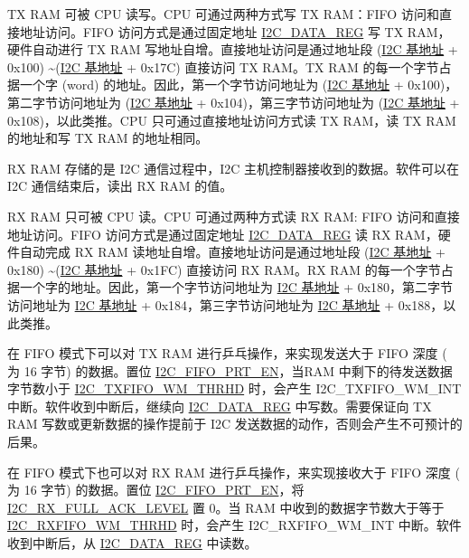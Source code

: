 \documentclass[main\_\_CN.tex]{subfiles}
\begin{document}
TX RAM 可被 CPU 读写。CPU 可通过两种方式写 TX RAM：FIFO 访问和直接地址访问。FIFO 访问方式是通过固定地址 \hyperref[regdesc:I2CDATAREG]{I2C\_DATA\_REG} 写 TX RAM，硬件自动进行 TX RAM 写地址自增。直接地址访问是通过地址段 (\hyperref[tab:sysmem-base-address]{I2C 基地址} + 0x100) \textasciitilde (\hyperref[tab:sysmem-base-address]{I2C 基地址} + 0x17C) 直接访问 TX RAM。TX RAM 的每一个字节占据一个字 (word) 的地址。因此，第一个字节访问地址为 (\hyperref[tab:sysmem-base-address]{I2C 基地址} + 0x100)，第二字节访问地址为 (\hyperref[tab:sysmem-base-address]{I2C 基地址} + 0x104)，第三字节访问地址为 (\hyperref[tab:sysmem-base-address]{I2C 基地址} + 0x108)，以此类推。CPU 只可通过直接地址访问方式读 TX RAM，读 TX RAM 的地址和写 TX RAM 的地址相同。

RX RAM 存储的是 I2C 通信过程中，I2C 主机控制器接收到的数据。软件可以在 I2C 通信结束后，读出 RX RAM 的值。


RX RAM 只可被 CPU 读。CPU 可通过两种方式读 RX RAM: FIFO 访问和直接地址访问。FIFO 访问方式是通过固定地址 \hyperref[regdesc:I2CDATAREG]{I2C\_DATA\_REG} 读 RX RAM，硬件自动完成 RX RAM 读地址自增。直接地址访问是通过地址段 (\hyperref[tab:sysmem-base-address]{I2C 基地址} + 0x180) \textasciitilde (\hyperref[tab:sysmem-base-address]{I2C 基地址} + 0x1FC) 直接访问 RX RAM。RX RAM 的每一个字节占据一个字的地址。因此，第一个字节访问地址为 \hyperref[tab:sysmem-base-address]{I2C 基地址} + 0x180，第二字节访问地址为 \hyperref[tab:sysmem-base-address]{I2C 基地址} + 0x184，第三字节访问地址为 \hyperref[tab:sysmem-base-address]{I2C 基地址} + 0x188，以此类推。

在 FIFO 模式下可以对 TX RAM 进行乒乓操作，来实现发送大于 FIFO 深度 (\chipname{} 为 16 字节) 的数据。置位 \hyperref[fielddesc:I2CFIFOPRTEN]{I2C\_FIFO\_PRT\_EN}，当RAM 中剩下的待发送数据字节数小于 \hyperref[fielddesc:I2CTXFIFOWMTHRHD]{I2C\_TXFIFO\_WM\_THRHD} 时，会产生 I2C\_TXFIFO\_WM\_INT 中断。软件收到中断后，继续向 \hyperref[regdesc:I2CDATAREG]{I2C\_DATA\_REG} 中写数。需要保证向 TX RAM 写数或更新数据的操作提前于 I2C 发送数据的动作，否则会产生不可预计的后果。

在 FIFO 模式下也可以对 RX RAM 进行乒乓操作，来实现接收大于 FIFO 深度 (\chipname{} 为 16 字节) 的数据。置位 \hyperref[fielddesc:I2CFIFOPRTEN]{I2C\_FIFO\_PRT\_EN}，将 \hyperref[fielddesc:I2CRXFULLACKLEVEL]{I2C\_RX\_FULL\_ACK\_LEVEL} 置 0。当 RAM 中收到的数据字节数大于等于 \hyperref[fielddesc:I2CRXFIFOWMTHRHD]{I2C\_RXFIFO\_WM\_THRHD} 时，会产生 I2C\_RXFIFO\_WM\_INT 中断。软件收到中断后，从 \hyperref[regdesc:I2CDATAREG]{I2C\_DATA\_REG} 中读数。
\end{document}
